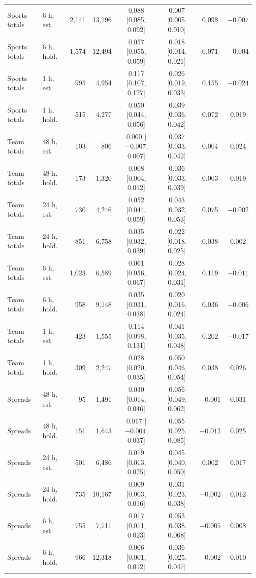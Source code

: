 \begin{table}[ht]
\begin{threeparttable}
\begin{tabular}{@{}llrrcccc@{}}
Sports totals & 6 h, est. & 2,141 & 13,196 & 0.088 [0.085, 0.092] & 0.007 [0.005, 0.010] & 0.098 & $-0.007$ \\
Sports totals & 6 h, hold. & 1,574 & 12,494 & 0.057 [0.055, 0.059] & 0.018 [0.014, 0.021] & 0.071 & $-0.004$ \\
Sports totals & 1 h, est. & 995 & 4,954 & 0.117 [0.107, 0.127] & 0.026 [0.019, 0.033] & 0.155 & $-0.024$ \\
Sports totals & 1 h, hold. & 515 & 4,277 & 0.050 [0.044, 0.056] & 0.039 [0.036, 0.042] & 0.072 & 0.019 \\
Team totals & 48 h, est. & 103 & 806 & 0.000 [$-0.007$, 0.007] & 0.037 [0.033, 0.042] & 0.004 & 0.024 \\
Team totals & 48 h, hold. & 173 & 1,320 & 0.008 [0.004, 0.012] & 0.036 [0.033, 0.039] & 0.003 & 0.019 \\
Team totals & 24 h, est. & 730 & 4,246 & 0.052 [0.044, 0.059] & 0.043 [0.032, 0.053] & 0.075 & $-0.002$ \\
Team totals & 24 h, hold. & 851 & 6,758 & 0.035 [0.032, 0.039] & 0.022 [0.018, 0.025] & 0.038 & 0.002 \\
Team totals & 6 h, est. & 1,023 & 6,589 & 0.061 [0.056, 0.067] & 0.028 [0.024, 0.031] & 0.119 & $-0.011$ \\
Team totals & 6 h, hold. & 958 & 9,148 & 0.035 [0.031, 0.038] & 0.020 [0.016, 0.024] & 0.036 & $-0.006$ \\
Team totals & 1 h, est. & 423 & 1,555 & 0.114 [0.098, 0.131] & 0.041 [0.035, 0.048] & 0.202 & $-0.017$ \\
Team totals & 1 h, hold. & 309 & 2,247 & 0.028 [0.020, 0.035] & 0.050 [0.046, 0.054] & 0.038 & 0.026 \\
Spreads & 48 h, est. & 95 & 1,491 & 0.030 [0.014, 0.046] & 0.056 [0.049, 0.062] & $-0.001$ & 0.031 \\
Spreads & 48 h, hold. & 151 & 1,643 & 0.017 [$-0.004$, 0.037] & 0.055 [0.025, 0.085] & $-0.012$ & 0.025 \\
Spreads & 24 h, est. & 501 & 6,486 & 0.019 [0.013, 0.025] & 0.045 [0.040, 0.050] & 0.002 & 0.017 \\
Spreads & 24 h, hold. & 735 & 10,167 & 0.009 [0.003, 0.016] & 0.031 [0.023, 0.038] & $-0.002$ & 0.012 \\
Spreads & 6 h, est. & 755 & 7,711 & 0.017 [0.011, 0.023] & 0.053 [0.038, 0.068] & $-0.005$ & 0.008 \\
Spreads & 6 h, hold. & 966 & 12,318 & 0.006 [0.001, 0.012] & 0.036 [0.025, 0.047] & $-0.002$ & 0.010 \\

\end{tabular}
\end{threeparttable}
\end{table}
